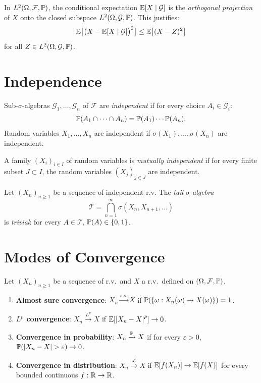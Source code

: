 \begin{intuition}[title=\textbf{Geometric Interpretation}]
In $L^2(\Omega, \mathcal{F}, \mathbb{P})$, the conditional expectation
$\mathbb{E}[X \mid \mathcal{G}]$ is the \emph{orthogonal projection} of $X$ onto the
closed subspace $L^2(\Omega, \mathcal{G}, \mathbb{P})$. This justifies:
\[
  \mathbb{E}\bigl[\bigl(X - \mathbb{E}[X \mid \mathcal{G}]\bigr)^2\bigr]
  \leq \mathbb{E}\bigl[(X - Z)^2\bigr]
\]
for all $Z \in L^2(\Omega, \mathcal{G}, \mathbb{P})$.
\end{intuition}

\section{Independence}

\begin{definition}
Sub-$\sigma$-algebras $\mathcal{G}_1, \ldots, \mathcal{G}_n$ of $\mathcal{F}$
are \emph{independent} if for every choice $A_i \in \mathcal{G}_i$:
\[
  \mathbb{P}(A_1 \cap \cdots \cap A_n) = \mathbb{P}(A_1) \cdots \mathbb{P}(A_n).
\]
Random variables $X_1, \ldots, X_n$ are independent if $\sigma(X_1), \ldots,
\sigma(X_n)$ are independent.
\end{definition}

\begin{definition}
A family $(X_i)_{i \in I}$ of random variables is \emph{mutually independent}
if for every finite subset $J \subset I$, the random variables $(X_j)_{j \in J}$
are independent.
\end{definition}

\begin{theorem}
\label{thm:kolmo01}
Let $(X_n)_{n \geq 1}$ be a sequence of independent r.v. The \emph{tail
$\sigma$-algebra}
\[
  \mathcal{T} = \bigcap_{n=1}^{\infty} \sigma(X_n, X_{n+1}, \ldots)
\]
is \emph{trivial}: for every $A \in \mathcal{T}$, $\mathbb{P}(A) \in \{0, 1\}$.
\end{theorem}

\section{Modes of Convergence}

\begin{definition}
Let $(X_n)_{n \geq 1}$ be a sequence of r.v.\ and $X$ a r.v.\ defined on
$(\Omega, \mathcal{F}, \mathbb{P})$.
\begin{enumerate}
  \item \textbf{Almost sure convergence}: $X_n \xrightarrow{\text{a.s.}} X$
    if $\mathbb{P}(\{\omega : X_n(\omega) \to X(\omega)\}) = 1$.
  \item \textbf{$L^p$ convergence}: $X_n \xrightarrow{L^p} X$ if
    $\mathbb{E}[\left| X_n - X \right|^p] \to 0$.
  \item \textbf{Convergence in probability}: $X_n \xrightarrow{\mathbb{P}} X$ if
    for every $\varepsilon > 0$, $\mathbb{P}(\left| X_n - X \right| > \varepsilon) \to 0$.
  \item \textbf{Convergence in distribution}: $X_n \xrightarrow{\mathcal{L}} X$ if
    $\mathbb{E}[f(X_n)] \to \mathbb{E}[f(X)]$ for every bounded continuous $f : \mathbb{R} \to \mathbb{R}$.
\end{enumerate}
\end{definition}

